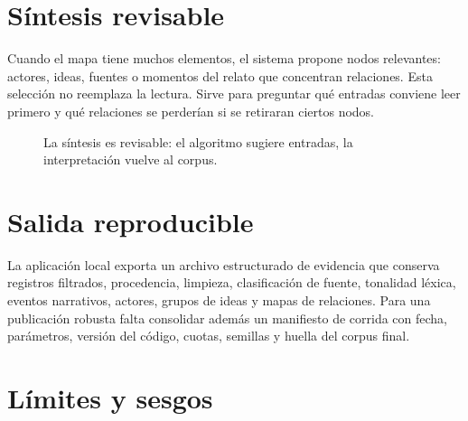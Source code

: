 \documentclass[11pt]{article}
\begin{document}
\section{Síntesis revisable}

Cuando el mapa tiene muchos elementos, el sistema propone nodos relevantes:
actores, ideas, fuentes o momentos del relato que concentran relaciones. Esta
selección no reemplaza la lectura. Sirve para preguntar qué entradas conviene
leer primero y qué relaciones se perderían si se retiraran ciertos nodos.

\begin{figure}[H]
\centering
{}
\caption{La síntesis es revisable: el algoritmo sugiere entradas, la interpretación vuelve al corpus.}
\label{fig:sintesis-es}
\end{figure}

\section{Salida reproducible}

La aplicación local exporta un archivo estructurado de evidencia que conserva
registros filtrados, procedencia, limpieza, clasificación de fuente, tonalidad
léxica, eventos narrativos, actores, grupos de ideas y mapas de relaciones. Para
una publicación robusta falta consolidar además un manifiesto de corrida con
fecha, parámetros, versión del código, cuotas, semillas y huella del corpus
final.

\section{Límites y sesgos}
\end{document}
